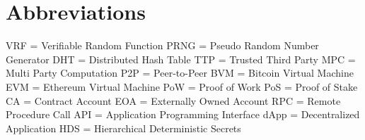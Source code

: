 \chapter*{Abbreviations}

VRF = Verifiable Random Function \newline
PRNG = Pseudo Random Number Generator \newline
DHT = Distributed Hash Table \newline
TTP = Trusted Third Party \newline
MPC = Multi Party Computation \newline
P2P = Peer-to-Peer \newline
BVM = Bitcoin Virtual Machine \newline
EVM = Ethereum Virtual Machine \newline
PoW = Proof of Work \newline
PoS = Proof of Stake \newline
CA = Contract Account \newline
EOA = Externally Owned Account \newline
RPC = Remote Procedure Call \newline
API = Application Programming Interface \newline
dApp = Decentralized Application \newline
HDS = Hierarchical Deterministic Secrets \newline